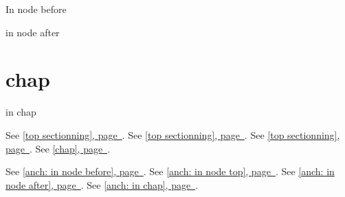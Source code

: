 \documentclass{book}
\newcommand{\Texinfothechapterheading}{}
\newcommand{\Texinfoheadingchaptername}{\chaptername}
\newcommand{\Texinfochapter}[1]{\chapter{#1}
\renewcommand{\Texinfothechapterheading}{\Texinfoheadingchaptername{} \thechapter{} }%
}%
\renewcommand{\_}{\Texinfounderscore\discretionary{}{}{}}
\begin{document}
\label{anchor:node-before}%

In node before
\label{anchor:anch_003a-in-node-before}%

\label{anchor:Top}%
\label{anchor:anch_003a-in-node-top}%
\label{anchor:after}%

in node after
\label{anchor:anch_003a-in-node-after}%

\Texinfochapter{{chap}}
\label{anchor:chap}%

in chap
\label{anchor:anch_003a-in-chap}%

See \hyperref[anchor:anch_003a-in-node-before]{[top sectionning], page~\pageref*{anchor:anch_003a-in-node-before}}.
See \hyperref[anchor:anch_003a-in-node-top]{[top sectionning], page~\pageref*{anchor:anch_003a-in-node-top}}.
See \hyperref[anchor:anch_003a-in-node-after]{[top sectionning], page~\pageref*{anchor:anch_003a-in-node-after}}.
See \hyperref[anchor:anch_003a-in-chap]{[chap], page~\pageref*{anchor:anch_003a-in-chap}}.

See \hyperref[anchor:anch_003a-in-node-before]{[anch: in node before], page~\pageref*{anchor:anch_003a-in-node-before}}.
See \hyperref[anchor:anch_003a-in-node-top]{[anch: in node top], page~\pageref*{anchor:anch_003a-in-node-top}}.
See \hyperref[anchor:anch_003a-in-node-after]{[anch: in node after], page~\pageref*{anchor:anch_003a-in-node-after}}.
See \hyperref[anchor:anch_003a-in-chap]{[anch: in chap], page~\pageref*{anchor:anch_003a-in-chap}}.
\end{document}
